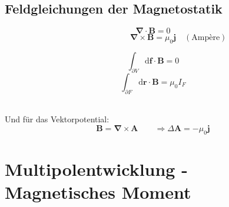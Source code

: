 \documentclass[titlepage,11pt,a4paper,ngerman]{report}
\newcommand{\tx}[1]{\textrm{#1}}
\newcommand{\dd}{\tx{d}}
\renewcommand{\vec}[1]{\boldsymbol{#1}}
\newcommand{\vabla}{\boldsymbol{\nabla}}
\begin{document}
\subsection{Feldgleichungen der Magnetostatik}

\begin{minipage}{.5\linewidth}
	\begin{equation*}
	\vabla \cdot \vec{B} = 0
	\end{equation*}
	\vspace{-5pt}
	\begin{equation*}
	\phantom{\quad (\tx{Amp\`ere})} \vabla \times \vec{B} = \mu_0 \vec{j} \quad (\tx{Amp\`ere})
	\end{equation*}
\end{minipage}%
\begin{minipage}{.5\linewidth}
	\begin{equation*}
	\int_{\partial V} \dd \vec{f} \cdot \vec{B} = 0
	\end{equation*}
	\begin{equation*}
	\int_{\partial F} \dd \vec{r} \cdot \vec{B} = \mu_0 I_F
	\end{equation*}
\end{minipage}%
\\
Und für das Vektorpotential:
\begin{equation*}
\vec{B} = \vabla \times \vec{A} \qquad \Rightarrow \Delta  \vec{A} = - \mu_0 \vec{j}
\end{equation*}

\section{Multipolentwicklung - Magnetisches Moment}
\end{document}
